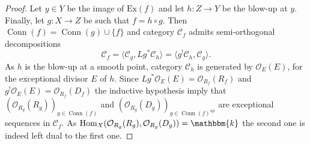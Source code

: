 \documentclass[12pt,a4paper]{amsart}
\newcommand{\f}{\varphi}
\newcommand{\cC}{{\mathcal{C}}}
\newcommand{\oO}{{\mathcal{O}}}
\newcommand{\kk}{\mathbbm{k}}
\newcommand{\Hom}{\mathop{\textrm{Hom}}\nolimits}
\newcommand{\Id}{\mathop{\textrm{Id}}\nolimits}
\newcommand{\Conn}{\mathop{\textrm{Conn}}\nolimits}
\newcommand{\opp}{\mathop{\textrm{op}}\nolimits}
\theoremstyle{definition}
\begin{document}
\begin{proof}
Let $y \in Y$ be the image of $\textrm{Ex}(f)$ and let $h\colon Z\to Y$ be the blow-up at $y$. Finally, let $g\colon X \to Z$ be such that $f = h \circ g$. Then $\Conn(f) = \Conn(g) \cup \{f\}$ and category $\cC_f$ admits semi-orthogonal decompositions
\begin{equation}
\cC_f = \langle \cC_g, Lg^* \cC_h \rangle = \langle g^! \cC_h, \cC_g \rangle.
\end{equation}
As $h$ is the blow-up at a smooth point, category $\cC_h$ is generated by $\oO_E(E)$, for the exceptional divisor $E$ of $h$. Since $Lg^* \oO_E(E) = \oO_{R_f}(R_f)$ and $g^! \oO_E(E) = \oO_{R_f}(D_f)$ the inductive hypothesis imply that $\left( \oO_{R_g}(R_g)\right)_{g\in \Conn(f)}$ and $\left( \oO_{R_g}(D_g) \right)_{g\in \Conn(f)^{\opp}}$ are exceptional sequences in $\cC_f$. As $\Hom_X(\oO_{R_g}(R_g), \oO_{R_g}(D_g)) = \kk$ the second one is indeed left dual to the first one.
%
%	
%	
%	
\end{proof}
\end{document}
